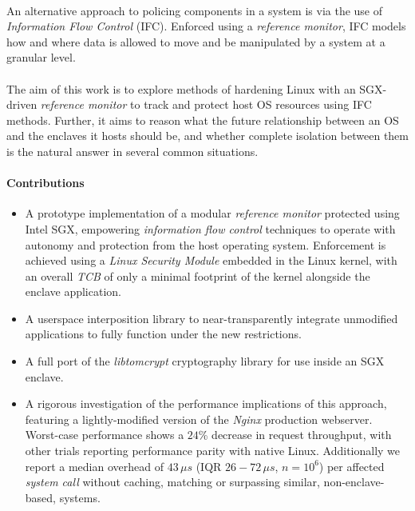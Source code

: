 \paragraph{} An alternative approach to policing components in a system is via the use of \textit{Information Flow Control} (IFC). Enforced using a \textit{reference monitor}, IFC models how and where data is allowed to move and be manipulated by a system at a granular level.

\paragraph{} The aim of this work is to explore methods of hardening Linux with an SGX-driven \textit{reference monitor} to track and protect host OS resources using IFC methods. Further, it aims to reason what the future relationship between an OS and the enclaves it hosts should be, and whether complete isolation between them is the natural answer in several common situations.


\paragraph{Contributions}
\begin{itemize}
    \item A prototype implementation of a modular \textit{reference monitor} protected using Intel SGX, empowering \textit{information flow control} techniques to operate with autonomy and protection from the host operating system. Enforcement is achieved using a \textit{Linux Security Module} embedded in the Linux kernel, with an overall \textit{TCB} of only a minimal footprint of the kernel alongside the enclave application.
    \item A userspace interposition library to near-transparently integrate unmodified applications to fully function under the new restrictions.
    \item A full port of the \textit{libtomcrypt} cryptography library for use inside an SGX enclave.
    \item A rigorous investigation of the performance implications of this approach, featuring a lightly-modified version of the \textit{Nginx} production webserver. Worst-case performance shows a $24$\% decrease in request throughput, with other trials reporting performance parity with native Linux. Additionally we report a median overhead of $43\,\mu s$ (IQR $26-72\,\mu s$, $n = 10^6$) per affected \textit{system call} without caching, matching or surpassing similar, non-enclave-based, systems.
\end{itemize}